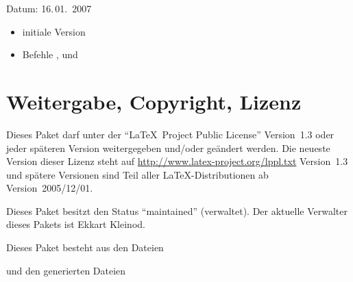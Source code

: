 
Datum: 16.\,01.~2007
\begin{itemize}
	\item initiale Version
	\item Befehle ,  und 
\end{itemize}


\section{Weitergabe, Copyright, Lizenz}



Dieses Paket darf unter der "`\LaTeX\ Project Public License"' Version~1.3 oder jeder späteren Version weitergegeben und/oder geändert werden.
Die neueste Version dieser Lizenz steht auf \url{http://www.latex-project.org/lppl.txt} Version~1.3 und spätere Versionen sind Teil aller \LaTeX-Distributionen ab Version~2005/12/01.

Dieses Paket besitzt den Status "`maintained"' (verwaltet).
Der aktuelle Verwalter dieses Pakets ist Ekkart Kleinod.

Dieses Paket besteht aus den Dateien



und den generierten Dateien




